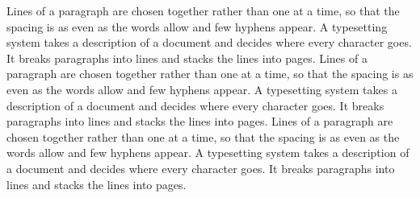 \documentclass{article}
\begin{document}
Lines of a paragraph are chosen together rather than one at a time, so that the spacing is as even as the words allow and few hyphens appear. A typesetting system takes a description of a document and decides where every character goes. It breaks paragraphs into lines and stacks the lines into pages. Lines of a paragraph are chosen together rather than one at a time, so that the spacing is as even as the words allow and few hyphens appear. A typesetting system takes a description of a document and decides where every character goes. It breaks paragraphs into lines and stacks the lines into pages. Lines of a paragraph are chosen together rather than one at a time, so that the spacing is as even as the words allow and few hyphens appear. A typesetting system takes a description of a document and decides where every character goes. It breaks paragraphs into lines and stacks the lines into pages.
\end{document}
